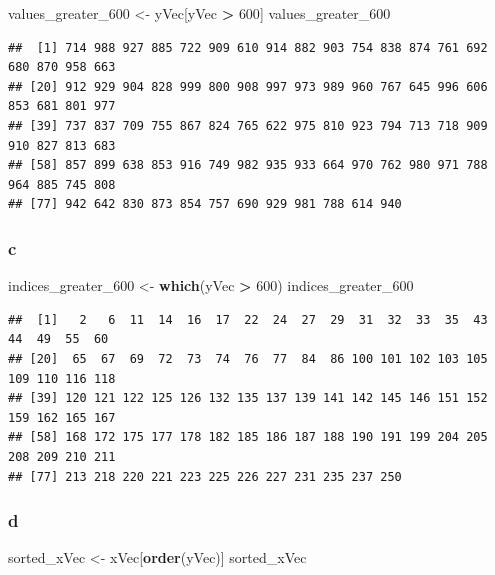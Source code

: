 \documentclass[
]{article}
\newenvironment{Shaded}{\begin{snugshade}}{\end{snugshade}}
\newcommand{\DecValTok}[1]{\textcolor[rgb]{0.00,0.00,0.81}{#1}}
\newcommand{\FunctionTok}[1]{\textcolor[rgb]{0.13,0.29,0.53}{\textbf{#1}}}
\newcommand{\NormalTok}[1]{#1}
\newcommand{\OtherTok}[1]{\textcolor[rgb]{0.56,0.35,0.01}{#1}}
\newcommand{\SpecialCharTok}[1]{\textcolor[rgb]{0.81,0.36,0.00}{\textbf{#1}}}
\begin{document}
\begin{Shaded}
\begin{Highlighting}[]
\NormalTok{values\_greater\_600 }\OtherTok{\textless{}{-}}\NormalTok{ yVec[yVec }\SpecialCharTok{\textgreater{}} \DecValTok{600}\NormalTok{]}
\NormalTok{values\_greater\_600}
\end{Highlighting}
\end{Shaded}

\begin{verbatim}
##  [1] 714 988 927 885 722 909 610 914 882 903 754 838 874 761 692 680 870 958 663
## [20] 912 929 904 828 999 800 908 997 973 989 960 767 645 996 606 853 681 801 977
## [39] 737 837 709 755 867 824 765 622 975 810 923 794 713 718 909 910 827 813 683
## [58] 857 899 638 853 916 749 982 935 933 664 970 762 980 971 788 964 885 745 808
## [77] 942 642 830 873 854 757 690 929 981 788 614 940
\end{verbatim}

\subsubsection{c}\label{c}

\begin{Shaded}
\begin{Highlighting}[]
\NormalTok{indices\_greater\_600 }\OtherTok{\textless{}{-}} \FunctionTok{which}\NormalTok{(yVec }\SpecialCharTok{\textgreater{}} \DecValTok{600}\NormalTok{)}
\NormalTok{indices\_greater\_600}
\end{Highlighting}
\end{Shaded}

\begin{verbatim}
##  [1]   2   6  11  14  16  17  22  24  27  29  31  32  33  35  43  44  49  55  60
## [20]  65  67  69  72  73  74  76  77  84  86 100 101 102 103 105 109 110 116 118
## [39] 120 121 122 125 126 132 135 137 139 141 142 145 146 151 152 159 162 165 167
## [58] 168 172 175 177 178 182 185 186 187 188 190 191 199 204 205 208 209 210 211
## [77] 213 218 220 221 223 225 226 227 231 235 237 250
\end{verbatim}

\subsubsection{d}\label{d}

\begin{Shaded}
\begin{Highlighting}[]
\NormalTok{sorted\_xVec }\OtherTok{\textless{}{-}}\NormalTok{ xVec[}\FunctionTok{order}\NormalTok{(yVec)]}
\NormalTok{sorted\_xVec}
\end{Highlighting}
\end{Shaded}
\end{document}
